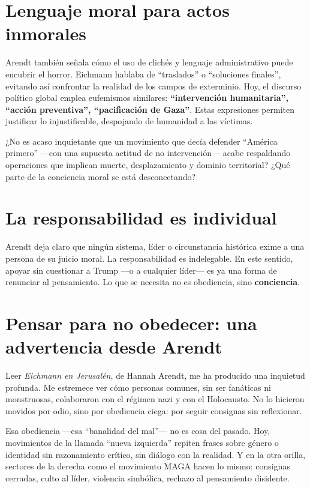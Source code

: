 \documentclass[12pt]{article}
\begin{document}
\section*{Lenguaje moral para actos inmorales}

Arendt también señala cómo el uso de clichés y lenguaje administrativo puede encubrir el horror. Eichmann hablaba de ``traslados'' o ``soluciones finales'', evitando así confrontar la realidad de los campos de exterminio. Hoy, el discurso político global emplea eufemismos similares: \textbf{``intervención humanitaria'', ``acción preventiva'', ``pacificación de Gaza''}. Estas expresiones permiten justificar lo injustificable, despojando de humanidad a las víctimas.

¿No es acaso inquietante que un movimiento que decía defender ``América primero'' ---con una supuesta actitud de no intervención--- acabe respaldando operaciones que implican muerte, desplazamiento y dominio territorial? ¿Qué parte de la conciencia moral se está desconectando?

\section*{La responsabilidad es individual}

Arendt deja claro que ningún sistema, líder o circunstancia histórica exime a una persona de su juicio moral. La responsabilidad es indelegable. En este sentido, apoyar sin cuestionar a Trump ---o a cualquier líder--- es ya una forma de renunciar al pensamiento. Lo que se necesita no es obediencia, sino \textbf{conciencia}.

\section*{Pensar para no obedecer: una advertencia desde Arendt}

Leer \textit{Eichmann en Jerusalén}, de Hannah Arendt, me ha producido una inquietud profunda. Me estremece ver cómo personas comunes, sin ser fanáticas ni monstruosas, colaboraron con el régimen nazi y con el Holocausto. No lo hicieron movidos por odio, sino por obediencia ciega: por seguir consignas sin reflexionar.

Esa obediencia ---esa ``banalidad del mal''--- no es cosa del pasado. Hoy, movimientos de la llamada ``nueva izquierda'' repiten frases sobre género o identidad sin razonamiento crítico, sin diálogo con la realidad. Y en la otra orilla, sectores de la derecha como el movimiento MAGA hacen lo mismo: consignas cerradas, culto al líder, violencia simbólica, rechazo al pensamiento disidente.
\end{document}
